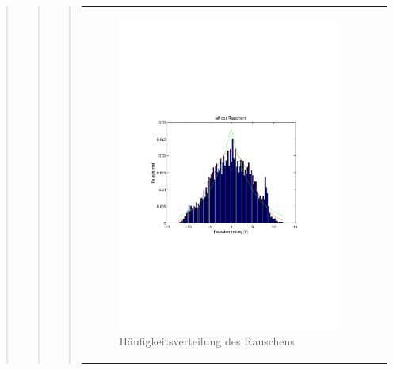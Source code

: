 \begin{quote}
\begin{quote}
\begin{quote}
\begin{center}
\begin{tabular}{ll}
\begin{minipage}{0.6\textwidth}
            \end{minipage}
            
            \begin{minipage}{0.6\textwidth}
                \begin{figure}[H]
                    \includegraphics[scale=0.7, trim = 15mm 80mm 20mm 90mm, clip]{Bilder/hist0}
                    \caption{Häufigkeitsverteilung des Rauschens}
                    \label{fig:hist0}
                \end{figure}
                
            \end{minipage}
            
        \end{tabular}
        \end{center}
            
            \vspace{2em}
            

\end{quote}
\end{quote}
\end{quote}
